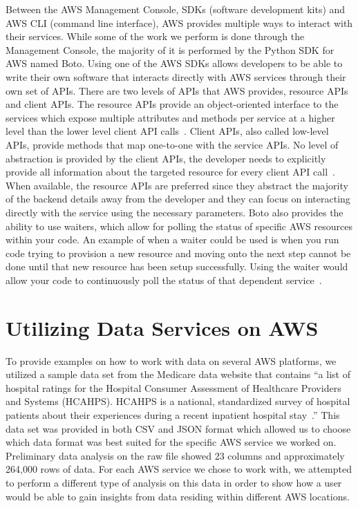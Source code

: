 Between the AWS Management Console, SDKs (software development kits) and AWS 
CLI (command line interface), AWS provides multiple ways to interact with 
their services. While some of the work we perform is done through the 
Management Console, the majority of it is performed by the Python SDK for 
AWS named Boto. Using one of the AWS SDKs allows developers to be able to 
write their own software that interacts directly with AWS services through 
their own set of APIs. There are two levels of APIs that AWS provides, 
resource APIs and client APIs. The resource APIs provide an object-oriented 
interface to the services which expose multiple attributes and methods per 
service at a higher level than the lower level client API 
calls~\cite{hid-sp18-521-BotoResources}. Client APIs, also called low-level 
APIs, provide methods that map one-to-one with the service APIs. No level of 
abstraction is provided by the client APIs, the developer needs to explicitly 
provide all information about the targeted resource for every client API 
call~\cite{hid-sp18-521-BotoClients}. When available, the resource APIs are 
preferred since they abstract the majority of the backend details away from 
the developer and they can focus on interacting directly with the service 
using the necessary parameters. Boto also provides the ability to use 
waiters, which allow for polling the status of specific AWS resources within 
your code. An example of when a waiter could be used is when you run code 
trying to provision a new resource and moving onto the next step cannot be 
done until that new resource has been setup successfully. Using the waiter 
would allow your code to continuously poll the status of that dependent 
service~\cite{hid-sp18-521-pythonsdk}.

\section{Utilizing Data Services on AWS}

To provide examples on how to work with data on several AWS platforms, we 
utilized a sample data set from the Medicare data website that contains ``a 
list of hospital ratings for the Hospital Consumer Assessment of Healthcare 
Providers and Systems (HCAHPS). HCAHPS is a national, standardized survey of 
hospital patients about their experiences during a recent inpatient hospital 
stay~\cite{hid-sp18-521-MedicareData}.'' This data set was provided in both 
CSV and JSON format which allowed us to choose which data format was best 
suited for the specific AWS service we worked on. Preliminary data analysis 
on the raw file showed 23 columns and approximately 264,000 rows of data. 
For each AWS service we chose to work with, we attempted to perform a 
different type of analysis on this data in order to show how a user would be 
able to gain insights from data residing within different AWS locations. 

